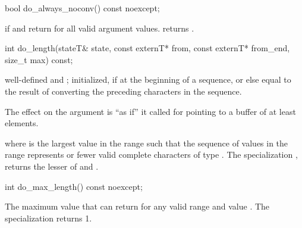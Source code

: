 %
\begin{itemdecl}
bool do_always_noconv() const noexcept;
\end{itemdecl}

\begin{itemdescr}
\pnum
\returns
{}
if
and
return
for all valid argument values.
returns
.
\end{itemdescr}

%
\begin{itemdecl}
int do_length(stateT& state, const externT* from, const externT* from_end,
              size_t max) const;
\end{itemdecl}

\begin{itemdescr}
\pnum
\preconditions
{}
well-defined and
;
 initialized, if at the beginning of a sequence, or else equal to
the result of converting the preceding characters in the sequence.

\pnum
\effects
The effect on the  argument is ``as if'' it called
for  pointing to a buffer of at least  elements.

\pnum
\returns
{}
where
is the largest value in the range
such that the sequence of values in the range
represents
or fewer valid complete characters of type
.
The specialization
,
returns the lesser of
and
.
\end{itemdescr}

%
\begin{itemdecl}
int do_max_length() const noexcept;
\end{itemdecl}

\begin{itemdescr}
\pnum
\returns
The maximum value that
can return for any valid range
and
value
.
The specialization
returns 1.
\end{itemdescr}

